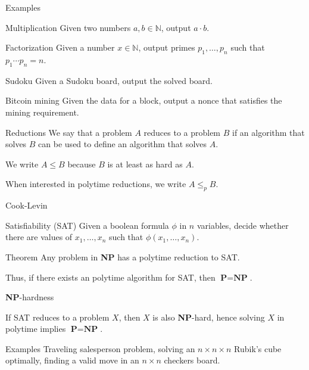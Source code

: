 \documentclass{beamer} %
\theoremstyle{definition}
\theoremstyle{remark}
\begin{document}
\begin{frame}{Examples}
	\begin{block}{Multiplication}
		Given two numbers $a, b \in \mathbb{N}$, output $a\cdot b$.
	\end{block}
	\pause
	\begin{block}{Factorization}
		Given a number $x \in \mathbb{N}$, output primes $p_1, \dots, p_n$ such that $p_1 \cdots p_n = n$.
	\end{block}
	\pause
	\begin{block}{Sudoku}
		Given a Sudoku board, output the solved board.
	\end{block}
	\pause
	\begin{block}{Bitcoin mining}
		Given the data for a block, output a nonce that satisfies the mining requirement.
	\end{block}
\end{frame}
\begin{frame}{Reductions}
	We say that a problem $A$ reduces to a problem $B$ if an algorithm that solves $B$ can be used to define an algorithm that solves $A$.
	
	
	\vspace{10pt}
	\pause
	We write $A\leq B$ because $B$ is at least as hard as $A$.
	
	\vspace{10pt}
	\pause
	When interested in polytime reductions, we write $A \leq_{p} B$.
\end{frame}
\begin{frame}{Cook-Levin}
	\begin{block}{Satisfiability (SAT)}
		Given a boolean formula $\phi$ in $n$ variables, decide whether there are values of $x_1, \dots, x_n$ such that $\phi(x_1, \dots, x_n)$.
	\end{block}
	\pause
	\begin{block}{Theorem}
		Any problem in \textbf{NP} has a polytime reduction to SAT.
	\end{block}
	\vspace{10pt}
	\pause
	Thus, if there exists an polytime algorithm for SAT, then $\textbf{P} = \textbf{NP}$.
\end{frame}
\begin{frame}{\textbf{NP}-hardness}
	\begin{block}{}
		If SAT reduces to a problem $X$, then $X$ is also \textbf{NP}-hard, hence solving $X$ in polytime implies $\textbf{P} = \textbf{NP}$.
	\end{block}
	\pause
	\begin{block}{Examples}
		Traveling salesperson problem, solving an $n\times n\times n$ Rubik's cube optimally, finding a valid move in an $n\times n$ checkers board.
	\end{block}
\end{frame}
\end{document}
